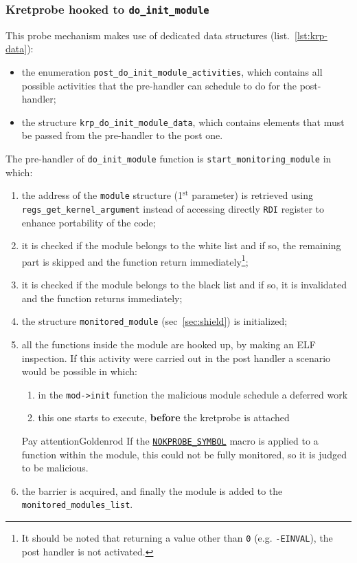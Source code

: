 \documentclass{article}
\begin{document}
	\subsubsection{Kretprobe hooked to \texttt{do\_init\_module}}
	This probe mechanism makes use of dedicated data structures (list.~\ref{lst:krp-data}):
	\begin{itemize}
		\item the enumeration \texttt{post\_do\_init\_module\_activities}, which contains all possible activities that
		the pre-handler can schedule to do for the post-handler;
		\item the structure \texttt{krp\_do\_init\_module\_data}, which contains elements that must be passed from the
		pre-handler to the post one.
	\end{itemize}


	The pre-handler of \texttt{do\_init\_module} function is \texttt{start\_monitoring\_module} in which:
	\begin{enumerate}
		\item the address of the \texttt{module} structure (1$^{\text{st}}$ parameter) is retrieved using \texttt{regs\_get\_kernel\_argument} instead of accessing directly \texttt{RDI} register to enhance
		portability of the code;
		\item it is checked if the module belongs to the white list and if so, the remaining part is skipped
		and the function return immediately\footnote{It should be noted that returning a value other than \texttt{0}
		(e.g. \texttt{-EINVAL}), the post handler is not activated.};
		\item it is checked if the module belongs to the black list and if so, it is invalidated and the function
		returns immediately;
		\item the structure \texttt{monitored\_module} (sec~\ref{sec:shield}) is initialized;
		\item all the functions inside the module are hooked up, by making an ELF inspection. If this activity were
		carried out in the post handler	a scenario would be possible in which:
		\begin{enumerate}
			\item in the \texttt{mod->init} function the malicious module schedule a deferred work
			\item this one starts to execute, \textbf{before} the kretprobe is attached
		\end{enumerate}

		\begin{custombox}{Pay attention}{Goldenrod}
			If the
			\href{https://elixir.bootlin.com/linux/v5.17/source/include/asm-generic/kprobes.h#L15}{\texttt{NOKPROBE\_SYMBOL}}
			macro is applied to a function within the module, this could not be fully monitored, so it is judged
			to be malicious.
		\end{custombox}
		\item the barrier is acquired, and finally the module is added to the \texttt{monitored\_modules\_list}.
	\end{enumerate}
\end{document}
